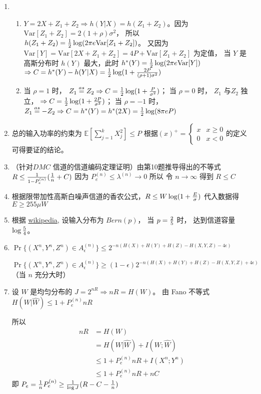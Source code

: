 \documentclass{article}
\def\E{\mathbb{E}}
\def\Var{\textrm{Var}}
\begin{document}
\begin{enumerate}
\item 
\begin{enumerate}[label=(\alph*)] 
\item 
$ Y = 2 X + Z_1 + Z_2 \Rightarrow h(Y|X) = h(Z_1 + Z_2) $。因为 $\Var[Z_1 + Z_2 ] =  2(1+ \rho) \sigma^2 $，
所以 $ h(Z_1 + Z_2) = { 1 \over 2} \log (2\pi e \Var[Z_1 + Z_2] )$。
又因为 $ \Var[Y] = \Var[2X + Z_1 + Z_2 ] = 4 P + \Var[Z_1 + Z_2 ]  $  为定值， 当 $ Y $ 是高斯分布时 $h (Y) $ 
最大，此时 $ h^*(Y) = { 1 \over 2} \log (2\pi e \Var[Y] )$
$ \Rightarrow C = h^*(Y) - h(Y|X) = {1 \over 2} \log ( 1 + { 2P \over (\rho+1) \sigma^2})$
\item 当 $ \rho = 1 $ 时， $ Z_1 \overset{as}{=} Z_2  \Rightarrow C = { 1 \over 2} \log ( 1 + { P \over \sigma^2})$；
当 $ \rho = 0 $ 时， $ Z_1 $ 与$ Z_2 $ 独立， $ \Rightarrow C = { 1 \over 2} \log ( 1 + { 2P \over \sigma^2})$；
当 $ \rho = -1 $ 时， $ Z_1 \overset{as}{=} -Z_2 \Rightarrow C = h^*(Y) = h^*(2X) = { 1\over 2} \log (8\pi e P) $
\end{enumerate}
\item
总的输入功率的约束为 $ \E [ \sum_{j = 1}^k X_j^2 ]\leq P $
根据$(x)^{+} = \begin{cases} x & x \geq 0 \\ 0 & x< 0 \end{cases}$的定义 可得要证的结论。
\item （针对$DMC$ 信道的信道编码定理证明）由第10题推导得出的不等式 
$ R \leq { 1 \over 1 - P_e^{(n)} } ({ 1 \over n}  + C)$
因为 $ P_e^{(n)} \leq \lambda^{(n)} \to 0 $ 所以 令 $ n \to \infty $ 得到 $ R \leq C$
\item 根据限带加性高斯白噪声信道的香农公式，$R \leq W \log (1 + { E \over \sigma } ) $ 代入数据得 $ E \geq 255\mu W$
\item
根据 \href{https://en.wikipedia.org/wiki/Z-channel_(information_theory)}{wikipedia}, 设输入分布为 $Bern(p) $，
当 $ p = { 2 \over 5} $ 时， 达到信道容量 $ \log { 5 \over 4} $。
\item $ \Pr\{ (X^n, Y^n, Z^n ) \in A_{\epsilon}^{(n)} \} \leq 2^{ -n ( H(X) + H(Y) + H(Z) - H(X, Y, Z) - 4 \epsilon ) } $

$ \Pr\{ (X^n, Y^n, Z^n ) \in A_{\epsilon}^{(n)} \} \geq (1-\epsilon)2^{ -n ( H(X) + H(Y) + H(Z) - H(X, Y, Z) + 4 \epsilon ) } $（当 $n$ 充分大时）
\item 设 $W$ 是均匀分布的 $ J = 2^{nR}  \Rightarrow nR = H(W)$。 由 Fano 不等式 $H ( W | \widehat{W} ) \leq 1 + P^{(n)}_e n R $

所以 
\begin{align*}
nR & = H(W) \\
& = H(W | \widehat{W}) + I(W; \widehat{W}) \\
& \leq 1 + P^{(n)}_e n R + I(X^n ; Y^n) \\
& \leq 1 + P^{(n)}_e n R + nC
\end{align*}
即 $ P_e = {1 \over n}P_e^{(n)} \geq {1 \over \log J}(R - C - {1 \over n}) $
\end{enumerate}
\end{document}
